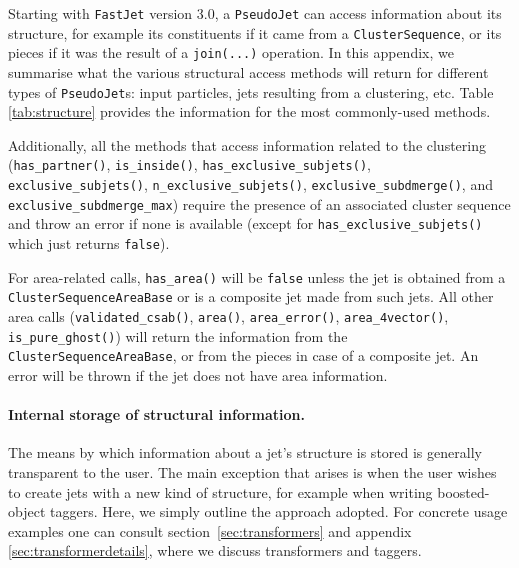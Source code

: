 \documentclass[12pt,a4]{article}
\newcommand{\fastjet}{\texttt{FastJet}\xspace}
\newcommand{\ttt}[1]{{\small\texttt{#1}}}
\newcommand{\ClusterSequence}{\ttt{ClusterSequence}\xspace}
\begin{document}
Starting with \fastjet version 3.0, a \ttt{PseudoJet} can access
information about its structure, for example its constituents if it came
from a \ClusterSequence, or its pieces if it was the result of a
\ttt{join(...)} operation.
%
In this appendix, we summarise what the various structural access
methods will return for different types of \ttt{PseudoJet}s: input
particles, jets resulting from a clustering, etc.
%
Table \ref{tab:structure} provides the information for the most
commonly-used methods. 

Additionally, all the methods that access information related to the
clustering (\ttt{has\_partner()}, \ttt{is\_inside()},
\ttt{has\_exclusive\_subjets()}, \ttt{exclusive\_subjets()},
\ttt{n\_exclusive\_subjets()}, \ttt{exclusive\_subdmerge()}, and
\ttt{exclusive\_subdmerge\_max}) require the presence of an associated
cluster sequence and throw an error if none is available (except for
\ttt{has\_exclusive\_subjets()} which just returns \ttt{false}).

For area-related calls, \ttt{has\_area()} will be \ttt{false} unless
the jet is obtained from a \ttt{ClusterSequenceAreaBase} or is a
composite jet made from such jets. All other area calls
(\ttt{validated\_csab()}, \ttt{area()}, \ttt{area\_error()},
\ttt{area\_4vector()}, \ttt{is\_pure\_ghost()}) will return the
information from the \ttt{ClusterSequenceAreaBase}, or from the pieces
in case of a composite jet. An error will be thrown if the jet does
not have area information.

\paragraph{Internal storage of structural information.}
%
The means by which information about a jet's structure is stored is
generally transparent to the user.
%
The main exception that arises is when the user wishes to create jets
with a new kind of structure, for example when writing boosted-object
taggers.
%
Here, we simply outline the approach adopted. For concrete usage
examples one can consult section~\ref{sec:transformers} and appendix \ref{sec:transformerdetails},
where we discuss transformers and taggers.
\end{document}
